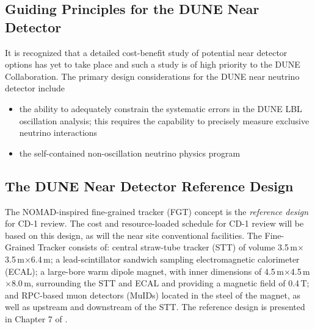 \subsection{Guiding Principles for the DUNE Near Detector}

It is recognized that a detailed cost-benefit study of potential near detector options 
has yet to take place and such a study is of high priority to the DUNE Collaboration. The
primary design considerations for the DUNE near neutrino detector include
\begin{itemize}
\item  %
the 
ability to adequately constrain the systematic errors in the DUNE LBL oscillation 
analysis; this requires the capability to precisely measure exclusive neutrino
interactions

\item %
the self-contained non-oscillation 
neutrino physics program

\end{itemize}

\subsection{The DUNE Near Detector Reference Design }

The NOMAD-inspired fine-grained tracker (FGT) concept is the \textit{reference 
design} for CD-1 review. The cost and resource-loaded schedule for CD-1 review 
will be based on this design, as will the near site conventional facilities. The 
Fine-Grained Tracker consists of:  central straw-tube tracker (STT) of volume 
3.5\,m$\times$3.5\,m$\times$6.4\,m; a lead-scintillator sandwich sampling electromagnetic calorimeter 
(ECAL); a large-bore warm dipole magnet, with inner dimensions of 
4.5\,m$\times$4.5\,m$\times$8.0\,m, surrounding the STT and ECAL and providing a magnetic field of 0.4\,T; 
and RPC-based muon detectors (MuIDs) located in the steel of the magnet, as well 
as upstream and downstream of the STT. The reference 
design is presented in Chapter 
7 of \voldune. 

